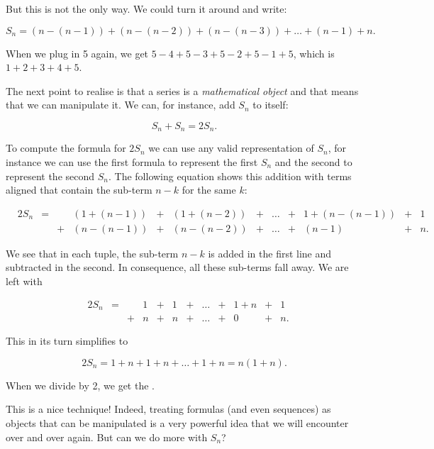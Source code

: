 \documentclass{scrreprt}
\begin{document}
But this is not the only way. We could turn it around
and write:

\begin{equation}
S_n = (n - (n-1)) + (n-(n-2)) + (n-(n-3)) + \dots + (n-1) + n.
\end{equation}

When we plug in 5 again, we get
$5 - 4 + 5 - 3 + 5 - 2 + 5 - 1 + 5$, which is
$1+2+3+4+5$.

The next point to realise is that a series is a
\emph{mathematical object} and that means that we can
manipulate it. We can, for instance, add $S_n$ to itself:

\[
S_n + S_n = 2S_n.
\]

To compute the formula for $2S_n$ we can use
any valid representation of $S_n$, for instance
we can use the first formula to represent the first $S_n$
and the second to represent the second $S_n$.
The following equation shows this addition with
terms aligned that contain the sub-term $n-k$ for the same $k$:

\begin{equation}
\begin{array}{lclclclccclcl}
&2S_n &=&   & (1 + (n-1)) & + & (1 + (n-2)) & + & \dots & + & 1 + (n-(n-1)) & + & 1 \\
&     & & + & (n - (n-1)) & + & (n-(n-2))   & + & \dots & + & (n-1) & + & n.
\end{array}
\end{equation}

We see that in each tuple, the sub-term $n-k$ is added in the first line
and subtracted in the second. In consequence,
all these sub-terms fall away. We are left with

\begin{equation}
\begin{array}{lclclclccclcl}
&2S_n &=&   & 1 & + & 1 & + & \dots & + & 1 + n & + & 1 \\
&     & & + & n & + & n & + & \dots & + & 0     & + & n.
\end{array}
\end{equation}

This in its turn simplifies to

\begin{equation}
2S_n = 1 + n + 1 + n + \dots + 1 + n =
n(1 + n).
\end{equation}

When we divide by 2, we get the .

This is a nice technique! Indeed, treating formulas (and even sequences)
as objects that can be manipulated is a very powerful idea that we will
encounter over and over again. But can we do more with $S_n$?
\end{document}

